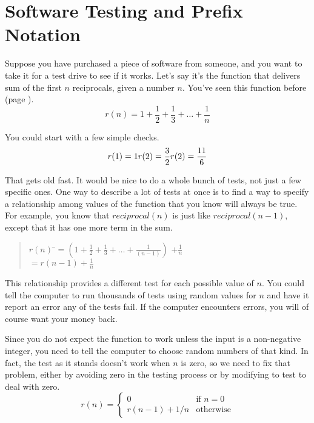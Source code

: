 \chapter{Software Testing and Prefix Notation}

Suppose you have purchased a piece of software from someone, and you want to take it for a test drive to see if it works. Let's say it's the function that delivers sum of the first $n$ reciprocals, given a number $n$.
You've seen this function before (page \pageref{reciprocalsdef}).
\begin{displaymath}
r(n) = 1 + \frac{1}{2} + \frac{1}{3} + \dots + \frac{1}{n}
\end{displaymath}

You could start with a few simple checks.
\begin{displaymath}
 r(1) = 1
\\
 r(2) = \frac{3}{2}
\\
 r(2) = \frac{11}{6}
\end{displaymath}

That gets old fast. It would be nice to do a whole bunch of tests,
not just a few specific ones.
One way to describe a lot of tests at once is to find a way to specify
a relationship among values of the function that you know will always be true.
For example, you know that $reciprocal(n)$ is just like $reciprocal(n-1)$,
except that it has one more term in the sum.
\begin{quote}
\begin{tabbing}
$r(n)$ \=$= (1 + \frac{1}{2} + \frac{1}{3} + \dots + \frac{1}{(n - 1)})$ $+ \frac{1}{n}$ \\
\vspace{1 mm}
                 \>$= r(n-1) + \frac{1}{n}$
\end{tabbing}
\end{quote}

This relationship provides a different test for each possible value of $n$.
You could tell the computer to run thousands of tests
using random values for $n$ and have it report an error any of the tests fail.
If the computer encounters errors, you will of course want your money back.

Since you do not expect the function to work unless the input
is a non-negative integer, you need to tell the computer
to choose random numbers of that kind.
In fact, the test as it stands doesn't work when $n$ is zero,
so we need to fix that problem, either by avoiding zero
in the testing process or by modifying to test to deal with zero.
\begin{displaymath}
r(n) =
\left\{
        \begin{array}{ll}
                0            & \mbox{if } n = 0 \\
                r(n-1) + 1/n & \mbox{otherwise}
        \end{array}
\right.
\end{displaymath}

